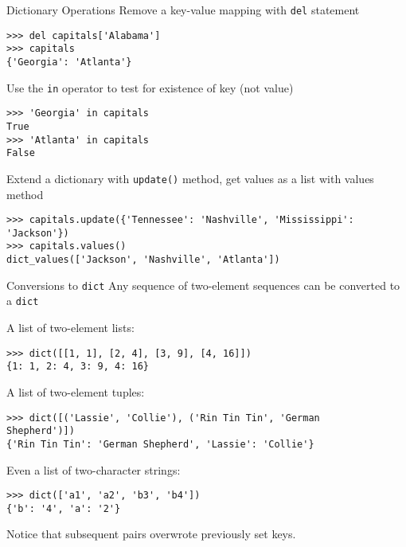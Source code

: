 \documentclass[smaller, aspectratio=1610]{beamer}
\begin{document}
\begin{frame}[label={sec:org64045d8},fragile]{Dictionary Operations}
 Remove a key-value mapping with \texttt{del} statement

\lstset{language=Python,label= ,caption= ,captionpos=b,numbers=none}
\begin{lstlisting}
>>> del capitals['Alabama']
>>> capitals
{'Georgia': 'Atlanta'}
\end{lstlisting}

Use the \texttt{in} operator to test for existence of key (not value)

\lstset{language=Python,label= ,caption= ,captionpos=b,numbers=none}
\begin{lstlisting}
>>> 'Georgia' in capitals
True
>>> 'Atlanta' in capitals
False
\end{lstlisting}

Extend a dictionary with \texttt{update()} method, get values as a list
with values method

\lstset{language=Python,label= ,caption= ,captionpos=b,numbers=none}
\begin{lstlisting}
>>> capitals.update({'Tennessee': 'Nashville', 'Mississippi':
'Jackson'})
>>> capitals.values()
dict_values(['Jackson', 'Nashville', 'Atlanta'])
\end{lstlisting}
\end{frame}

\begin{frame}[label={sec:org976cb81},fragile]{Conversions to \texttt{dict}}
 Any sequence of two-element sequences can be converted to a \texttt{dict}

A list of two-element lists:

\lstset{language=Python,label= ,caption= ,captionpos=b,numbers=none}
\begin{lstlisting}
>>> dict([[1, 1], [2, 4], [3, 9], [4, 16]])
{1: 1, 2: 4, 3: 9, 4: 16}
\end{lstlisting}

A list of two-element tuples:


\lstset{language=Python,label= ,caption= ,captionpos=b,numbers=none}
\begin{lstlisting}
>>> dict([('Lassie', 'Collie'), ('Rin Tin Tin', 'German
Shepherd')])
{'Rin Tin Tin': 'German Shepherd', 'Lassie': 'Collie'}
\end{lstlisting}

Even a list of two-character strings:

\lstset{language=Python,label= ,caption= ,captionpos=b,numbers=none}
\begin{lstlisting}
>>> dict(['a1', 'a2', 'b3', 'b4'])
{'b': '4', 'a': '2'}
\end{lstlisting}

Notice that subsequent pairs overwrote previously set keys.
\end{frame}
\end{document}
